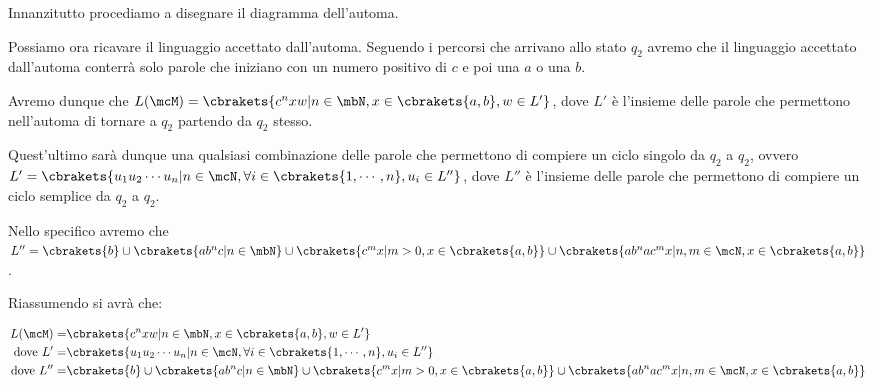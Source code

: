 Innanzitutto procediamo a disegnare il diagramma dell'automa.

\begin{figure}[ht]
    \centering
\end{figure}

Possiamo ora ricavare il linguaggio accettato dall'automa. Seguendo i percorsi che arrivano allo stato \(q_2\) avremo che il linguaggio accettato dall'automa conterrà solo parole che iniziano con un numero positivo di \(c\) e poi una \(a\) o una \(b\).

Avremo dunque che \(L(\mcM)=\cbrakets{c^{n}xw \vert n \in \mbN, x \in \cbrakets{a,b}, w \in L'} \), dove \(L'\) è l'insieme delle parole che permettono nell'automa di tornare a \(q_2\) partendo da \(q_2\) stesso.

Quest'ultimo sarà dunque una qualsiasi combinazione delle parole che permettono di compiere un ciclo singolo da \(q_2\) a \(q_2\), ovvero \(L'=\cbrakets{u_1u_2\cdots u_n\vert n \in \mcN, \forall i \in \cbrakets{1, \cdots, n}, u_i \in L''}\), dove \(L''\) è l'insieme delle parole che permettono di compiere un ciclo semplice da \(q_2\) a \(q_2\).

Nello specifico avremo che \(L''=\cbrakets{b} \cup \cbrakets{ab^{n}c \vert n \in \mbN} \cup \cbrakets{c^{m}x \vert m > 0, x \in \cbrakets{a,b}} \cup \cbrakets{ab^{n}ac^{m}x \vert n,m \in \mcN, x \in \cbrakets{a,b}}\).

Riassumendo si avrà che:

\begin{equation}
    \begin{split}
        L(\mcM) = & \cbrakets{c^{n}xw \vert n \in \mbN, x \in \cbrakets{a,b}, w \in L'} \\
        \text {dove } L' = & \cbrakets{u_1u_2\cdots u_n\vert n\in\mcN, \forall i \in \cbrakets{1, \cdots, n}, u_i \in L''} \\
        \text {dove } L'' = & \cbrakets{b} \cup \cbrakets{ab^{n}c \vert n \in \mbN} \cup \cbrakets{c^{m}x \vert m > 0, x \in \cbrakets{a,b}} \cup \cbrakets{ab^{n}ac^{m}x \vert n,m \in \mcN, x \in \cbrakets{a,b}}
    \end{split}
\end{equation}

